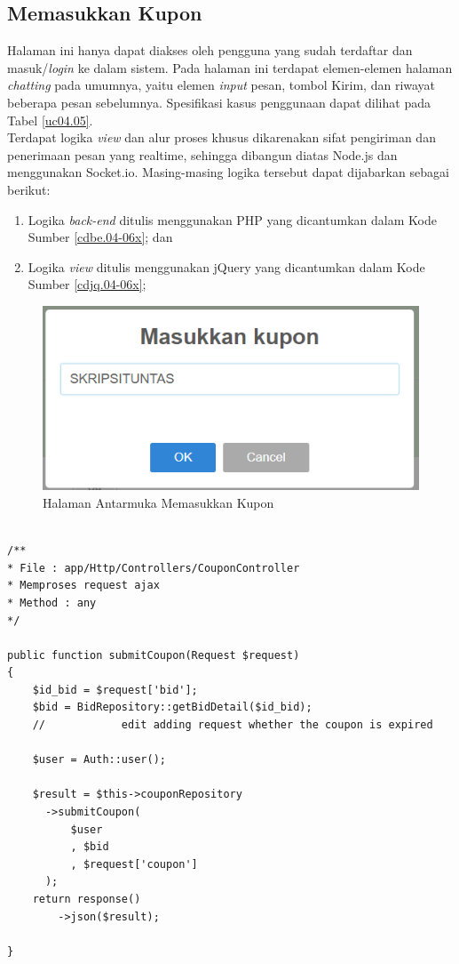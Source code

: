 \subsection{Memasukkan Kupon}
Halaman ini hanya dapat diakses oleh pengguna yang sudah terdaftar dan masuk/\textit{login} ke dalam sistem. Pada halaman ini terdapat elemen-elemen halaman \textit{chatting} pada umumnya, yaitu elemen \textit{input} pesan, tombol Kirim, dan riwayat beberapa pesan sebelumnya. Spesifikasi kasus penggunaan dapat dilihat pada Tabel \ref{uc04.05}.\\
\indent Terdapat logika \textit{view} dan alur proses khusus dikarenakan sifat pengiriman dan penerimaan pesan yang realtime, sehingga dibangun diatas Node.js dan menggunakan Socket.io. Masing-masing logika tersebut dapat dijabarkan sebagai berikut:
\begin{enumerate}
	\item Logika \textit{back-end} ditulis menggunakan PHP yang dicantumkan dalam Kode Sumber \ref{cdbe.04-06x}; dan
	\item Logika \textit{view} ditulis menggunakan jQuery yang dicantumkan dalam Kode Sumber \ref{cdjq.04-06x};
\end{enumerate}

\begin{figure}[H]
	\centering
	\includegraphics[width=\textwidth]{images/bab4/ui/04-06.png}
	\caption{Halaman Antarmuka Memasukkan Kupon}
	\label{ui.04-06x}
\end{figure}

\begin{lstlisting}[label=cdbe.04-06x,style=php,caption=Kode Sumber \textit{back-end} Memasukkan Kupon]

/** 
* File : app/Http/Controllers/CouponController
* Memproses request ajax
* Method : any
*/

public function submitCoupon(Request $request)
{
	$id_bid = $request['bid'];
	$bid = BidRepository::getBidDetail($id_bid);
	//            edit adding request whether the coupon is expired

	$user = Auth::user();

	$result = $this->couponRepository
	  ->submitCoupon(
	      $user
	      , $bid
	      , $request['coupon']
	  );
	return response()
	    ->json($result);

}

\end{lstlisting}

